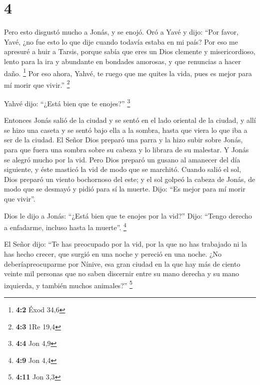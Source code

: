 \hypertarget{section-3}{%
\section{4}\label{section-3}}

 Pero esto disgustó mucho a Jonás, y se enojó.
 Oró a Yavé y dijo: ``Por favor, Yavé, ¿no fue esto lo que
dije cuando todavía estaba en mi país? Por eso me apresuré a huir a
Tarsis, porque sabía que eres un Dios clemente y misericordioso, lento
para la ira y abundante en bondades amorosas, y que renuncias a hacer
daño. \footnote{\textbf{4:2} Éxod 34,6}  Por eso ahora,
Yahvé, te ruego que me quites la vida, pues es mejor para mí morir que
vivir.'' \footnote{\textbf{4:3} 1Re 19,4}

 Yahvé dijo: ``¿Está bien que te enojes?'' \footnote{\textbf{4:4}
  Jon 4,9}

 Entonces Jonás salió de la ciudad y se sentó en el lado
oriental de la ciudad, y allí se hizo una caseta y se sentó bajo ella a
la sombra, hasta que viera lo que iba a ser de la ciudad. 
El Señor Dios preparó una parra y la hizo subir sobre Jonás, para que
fuera una sombra sobre su cabeza y lo librara de su malestar. Y Jonás se
alegró mucho por la vid.  Pero Dios preparó un gusano al
amanecer del día siguiente, y éste masticó la vid de modo que se
marchitó.  Cuando salió el sol, Dios preparó un viento
bochornoso del este; y el sol golpeó la cabeza de Jonás, de modo que se
desmayó y pidió para sí la muerte. Dijo: ``Es mejor para mí morir que
vivir''.

 Dios le dijo a Jonás: ``¿Está bien que te enojes por la
vid?'' Dijo: ``Tengo derecho a enfadarme, incluso hasta la muerte''.
\footnote{\textbf{4:9} Jon 4,4}

 El Señor dijo: ``Te has preocupado por la vid, por la
que no has trabajado ni la has hecho crecer, que surgió en una noche y
pereció en una noche.  ¿No deberíapreocuparme por Nínive,
esa gran ciudad en la que hay más de ciento veinte mil personas que no
saben discernir entre su mano derecha y su mano izquierda, y también
muchos animales?'' \footnote{\textbf{4:11} Jon 3,3}
